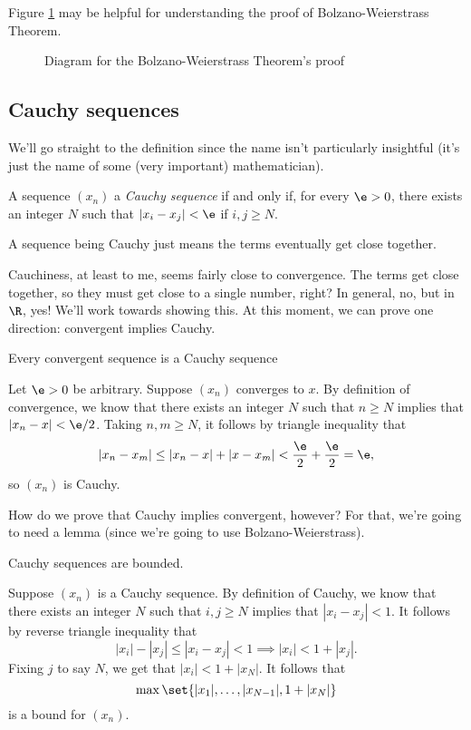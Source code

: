 \documentclass[class=article, crop=false]{standalone}
\begin{document}
Figure \ref{fig:bolzano-weierstrass} may be helpful for understanding the proof of Bolzano-Weierstrass Theorem.
\begin{figure}[ht]
    \centering
    \caption{Diagram for the Bolzano-Weierstrass Theorem's proof}
    \label{fig:bolzano-weierstrass}
\end{figure}


\subsection{Cauchy sequences}

We'll go straight to the definition since the name isn't particularly insightful (it's just the name of some (very important) mathematician).
\begin{defn}
    A sequence $(x_n)$ a \textit{Cauchy sequence} if and only if, for every $\e > 0$, there exists an integer $N$ such that $|x_i-x_j| < \e$ if $i,j \geq N$.
\end{defn}
A sequence being Cauchy just means the terms eventually get close together.

Cauchiness, at least to me, seems fairly close to convergence. The terms get close together, so they must get close to a single number, right? In general, no, but in $\R$, yes! We'll work towards showing this. At this moment, we can prove one direction: convergent implies Cauchy.
\begin{thm}{\label{thm:convergent implies cauchy}}
    Every convergent sequence is a Cauchy sequence
\end{thm}
\begin{pf}
    Let $\e > 0$ be arbitrary. Suppose $(x_n)$ converges to $x$. By definition of convergence, we know that there exists an integer $N$ such that $n \geq N$ implies that $|x_n-x| < \e/2$. Taking $n,m \geq N$, it follows by triangle inequality that
        \[
            |x_n-x_m| \leq |x_n - x| + |x-x_m| < \frac{\e}{2} + \frac{\e}{2} = \e,
        \]
    so $(x_n)$ is Cauchy.
\end{pf}

How do we prove that Cauchy implies convergent, however? For that, we're going to need a lemma (since we're going to use Bolzano-Weierstrass).

\begin{lem}{\label{lem:cauchy implies bounded}}
    Cauchy sequences are bounded.
\end{lem}
\begin{pf}
    Suppose $(x_n)$ is a Cauchy sequence. By definition of Cauchy, we know that there exists an integer $N$ such that $i,j \geq N$ implies that $|x_i-x_j| < 1$. It follows by reverse triangle inequality that
        \[
            |x_i|-|x_j| \leq |x_i-x_j| < 1 \implies |x_i| < 1 + |x_j|.
        \]
    Fixing $j$ to say $N$, we get that $|x_i| < 1+|x_N|$. It follows that
        \[
            \max \set{|x_1|, \ldots, |x_{N-1}|, 1+ |x_N|}
        \]
    is a bound for $(x_n)$.
\end{pf}
\end{document}
